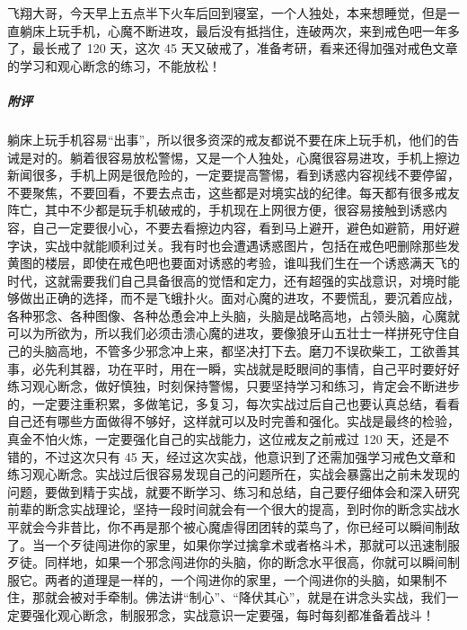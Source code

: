 \begin{case}
    飞翔大哥，今天早上五点半下火车后回到寝室，一个人独处，本来想睡觉，但是一直躺床上玩手机，心魔不断进攻，最后没有抵挡住，连破两次，来到戒色吧一年多了，最长戒了 120 天，这次 45 天又破戒了，准备考研，看来还得加强对戒色文章的学习和观心断念的练习，不能放松！
    \subparagraph{附评} 躺床上玩手机容易“出事”，所以很多资深的戒友都说不要在床上玩手机，他们的告诫是对的。躺着很容易放松警惕，又是一个人独处，心魔很容易进攻，手机上擦边新闻很多，手机上网是很危险的，一定要提高警惕，看到诱惑内容视线不要停留，不要聚焦，不要回看，不要去点击，这些都是对境实战的纪律。每天都有很多戒友阵亡，其中不少都是玩手机破戒的，手机现在上网很方便，很容易接触到诱惑内容，自己一定要很小心，不要去看擦边内容，看到马上避开，避色如避箭，用好避字诀，实战中就能顺利过关。我有时也会遭遇诱惑图片，包括在戒色吧删除那些发黄图的楼层，即使在戒色吧也要面对诱惑的考验，谁叫我们生在一个诱惑满天飞的时代，这就需要我们自己具备很高的觉悟和定力，还有超强的实战意识，对境时能够做出正确的选择，而不是飞蛾扑火。面对心魔的进攻，不要慌乱，要沉着应战，各种邪念、各种图像、各种怂恿会冲上头脑，头脑是战略高地，占领头脑，心魔就可以为所欲为，所以我们必须击溃心魔的进攻，要像狼牙山五壮士一样拼死守住自己的头脑高地，不管多少邪念冲上来，都坚决打下去。磨刀不误砍柴工，工欲善其事，必先利其器，功在平时，用在一瞬，实战就是眨眼间的事情，自己平时要好好练习观心断念，做好慎独，时刻保持警惕，只要坚持学习和练习，肯定会不断进步的，一定要注重积累，多做笔记，多复习，每次实战过后自己也要认真总结，看看自己还有哪些方面做得不够好，这样就可以及时完善和强化。实战是最终的检验，真金不怕火炼，一定要强化自己的实战能力，这位戒友之前戒过 120 天，还是不错的，不过这次只有 45 天，经过这次实战，他意识到了还需加强学习戒色文章和练习观心断念。实战过后很容易发现自己的问题所在，实战会暴露出之前未发现的问题，要做到精于实战，就要不断学习、练习和总结，自己要仔细体会和深入研究前辈的断念实战理论，坚持一段时间就会有一个很大的提高，到时你的断念实战水平就会今非昔比，你不再是那个被心魔虐得团团转的菜鸟了，你已经可以瞬间制敌了。当一个歹徒闯进你的家里，如果你学过擒拿术或者格斗术，那就可以迅速制服歹徒。同样地，如果一个邪念闯进你的头脑，你的断念水平很高，你就可以瞬间制服它。两者的道理是一样的，一个闯进你的家里，一个闯进你的头脑，如果制不住，那就会被对手牵制。佛法讲“制心”、“降伏其心”，就是在讲念头实战，我们一定要强化观心断念，制服邪念，实战意识一定要强，每时每刻都准备着战斗！
\end{case}

